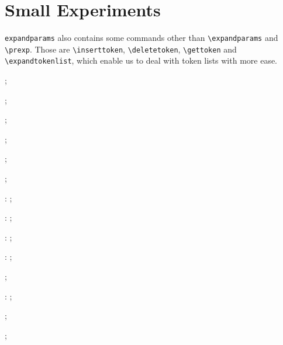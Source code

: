 \documentclass{jsarticle}
\makeatletter
\newcommand{\sepbybra}[1]{\@tfor\ch:=#1\do{[\ch]}}%
\def\csone{JK}%
\newcommand{\texcmd}[1]{\texttt{\textbackslash #1}}
\makeatother
\begin{document}
  \section{Small Experiments}
  \indent
    \texttt{expandparams} also contains some commands other than \texcmd{expandparams} and \texcmd{prexp}.
    Those are \texcmd{inserttoken}, \texcmd{deletetoken}, \texcmd{gettoken} and \texcmd{expandtokenlist},
    which enable us to deal with token lists with more ease.
  \par
  \noindent \the\temptl; \expandafter\sepbybra\expandafter{\the\temptl}\par
%
  \noindent \the\temptl; \expandafter\sepbybra\expandafter{\the\temptl}\par
%
  \noindent \the\temptl; \expandafter\sepbybra\expandafter{\the\temptl}\par
%
  \inserttoken{\temptl}{5}{\csone}%
  \noindent \the\temptl; \expandafter\sepbybra\expandafter{\the\temptl}\par
%
  \noindent \the\temptl; \expandafter\sepbybra\expandafter{\the\temptl}\par
%
  \noindent \the\temptl; \expandafter\sepbybra\expandafter{\the\temptl}\par
%
  : \the\temptoken; \expandafter\sepbybra\expandafter{\the\temptoken}\par
%
  : \the\temptoken; \expandafter\sepbybra\expandafter{\the\temptoken}\par
%
  : \the\temptoken; \expandafter\sepbybra\expandafter{\the\temptoken}\par
%
  : \the\temptoken; \expandafter\sepbybra\expandafter{\the\temptoken}\par
%
  \noindent \the\temptl; \expandafter\sepbybra\expandafter{\the\temptl}\par
%
  : \the\temptoken; \expandafter\sepbybra\expandafter{\the\temptoken}\par
%
  \noindent \the\temptl; \expandafter\sepbybra\expandafter{\the\temptl}\par
%
  \noindent \the\temptl; \expandafter\sepbybra\expandafter{\the\temptl}\par
\end{document}
